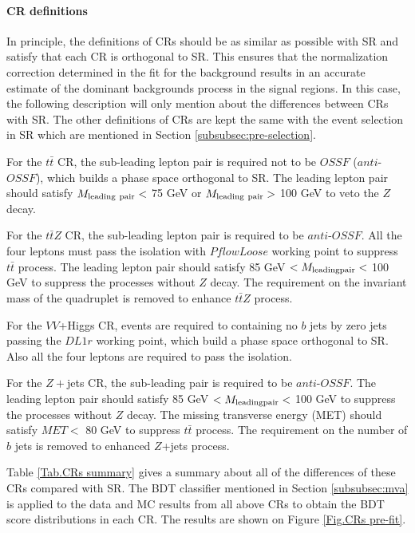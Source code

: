 \paragraph{CR definitions}

In principle, the definitions of CRs should be as similar as possible with SR and satisfy that each CR is orthogonal to SR. This ensures that the normalization correction determined in the fit for the background results in an accurate estimate of the dominant backgrounds process in the signal regions. In this case, the following description will only mention about the differences between CRs with SR. The other definitions of CRs are kept the same with the event selection in SR which are mentioned in Section \ref{subsubsec:pre-selection}.

For the $t\bar{t}$ CR, the sub-leading lepton pair is required not to be $OSSF$ ($anti$-$OSSF$), which builds a phase space orthogonal to SR. The leading lepton pair should satisfy $M_{\rm leading\ pair}<$ 75 GeV or $M_{\rm leading\ pair}>$ 100 GeV to veto the $Z$ decay.

For the $t\bar{t}Z$ CR, the sub-leading lepton pair is required to be $anti$-$OSSF$. All the four leptons must pass the isolation with $PflowLoose$ working point to suppress $t\bar{t}$ process. The leading lepton pair should satisfy 85 GeV $<M_{\rm leading pair}<$ 100 GeV to suppress the processes without $Z$ decay. The requirement on the invariant mass of the quadruplet is removed to enhance $t\bar{t}Z$ process.

For the $VV$+Higgs CR, events are required to containing no $b$ jets by zero jets passing the $DL1r$ working point, which build a phase space orthogonal to SR. Also all the four leptons are required to pass the isolation.

For the $Z+$jets CR, the sub-leading pair is required to be $anti$-$OSSF$. The leading lepton pair should satisfy 85 GeV $<M_{\rm leading pair}<$ 100 GeV to suppress the processes without $Z$ decay. The missing transverse energy (MET) should satisfy $MET<$ 80 GeV to suppress $t\bar{t}$ process. The requirement on the number of $b$ jets is removed to enhanced $Z$+jets process.

Table \ref{Tab.CRs summary} gives a summary about all of the differences of these CRs compared with SR. The BDT classifier mentioned in Section \ref{subsubsec:mva} is applied to the data and MC results from all above CRs to obtain the BDT score distributions in each CR. The results are shown on Figure \ref{Fig.CRs pre-fit}.

